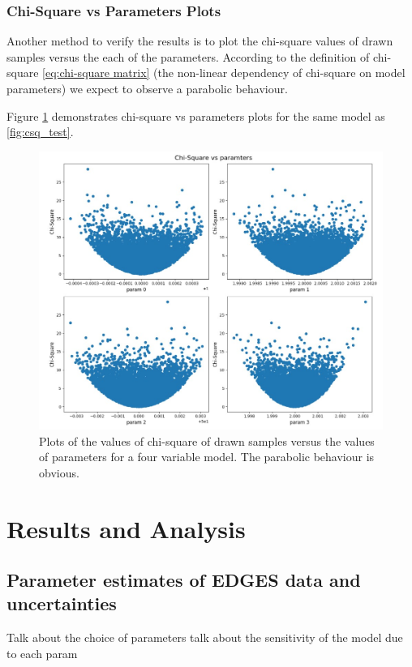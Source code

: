 \documentclass[12pt, TexShade, letterpaper]{report}
\begin{document}
\subsection{Chi-Square vs Parameters Plots}
\label{chap:method,sub:test,subsub:plot}
Another method to verify the results is to plot the chi-square values of drawn samples versus the each of the parameters. According to the definition of chi-square \ref{eq:chi-square matrix} (the non-linear dependency of chi-square on model parameters) we expect to observe a parabolic behaviour.\par
Figure \ref{fig:csq_params} demonstrates chi-square vs parameters plots for the same model as \ref{fig:csq_test}.
\begin{figure}[h!]
\centering
\includegraphics[scale =0.9]{csq_params.jpg}
\caption{Plots of the values of chi-square of drawn samples versus the values of parameters for a four variable model. The parabolic behaviour is obvious.}
\label{fig:csq_params}
\end{figure}
\chapter{Results and Analysis}
\label{chap:results}
\section{Parameter estimates of EDGES data and uncertainties}
Talk about the choice of parameters
talk about the sensitivity of the model due to each param
\end{document}
